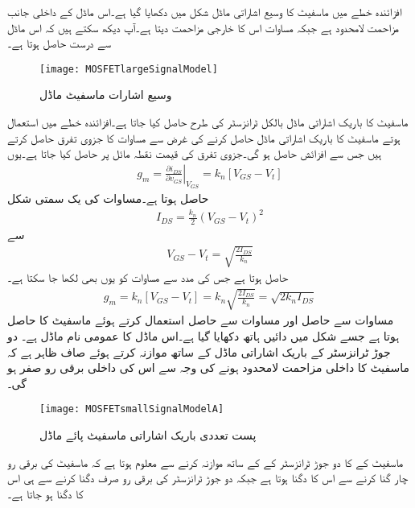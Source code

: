 افزائندہ خطے میں ماسفیٹ کا وسیع اشاراتی ماڈل شکل   میں دکھایا گیا ہے۔اس ماڈل کے داخلی جانب مزاحمت لامحدود ہے جبکہ مساوات   اس کا خارجی مزاحمت   دیتا ہے۔آپ دیکھ سکتے ہیں کہ اس ماڈل سے درست   حاصل ہوتا ہے۔
\begin{figure}
\centering
\texttt{[image: MOSFETlargeSignalModel]}
\caption{وسیع اشارات ماسفیٹ ماڈل}
\label{شکل_وسیع_اشارات_ماسفیٹ_ماڈل}
\end{figure}

ماسفیٹ کا باریک اشاراتی ماڈل بالکل  ٹرانزسٹر کی طرح حاصل کیا جاتا ہے۔افزائندہ خطے میں استعمال ہوتے ماسفیٹ کا باریک اشاراتی ماڈل حاصل کرنے کی غرض سے مساوات   کا جزوی تفرق حاصل کرتے ہیں جس سے افزائش  حاصل ہو گی۔جزوی تفرق کی قیمت نقطہ مائل  پر حاصل کیا جاتا ہے۔یوں
\begin{align} \label{مساوات_میدانی_موصلیت_نما}
g_m = \left. \frac{\partial i_{DS}}{\partial v_{GS}} \right |_{V_{GS}}=k_n \left[V_{GS}-V_t \right ]
\end{align}
حاصل ہوتا ہے۔مساوات   کی یک سمتی شکل
\begin{align*}
I_{DS}=\frac{k_n}{2}\left(V_{GS}-V_t \right)^2
\end{align*}
سے
\begin{align*}
V_{GS}-V_t=\sqrt{\frac{2 I_{DS}}{k_n}}
\end{align*}
حاصل ہوتا ہے جس کی مدد سے مساوات  کو  یوں بھی لکھا جا سکتا ہے۔
\begin{align} \label{مساوات_میدانی_موصلیت_نما_الف}
g_m=k_n \left[V_{GS}-V_t \right ]=k_n \sqrt{\frac{2 I_{DS}}{k_n}}=\sqrt{2 k_n I_{DS}}
\end{align}
مساوات   سے حاصل   اور مساوات   سے حاصل   استعمال کرتے ہوئے ماسفیٹ کا  حاصل ہوتا ہے جسے شکل   میں دائیں ہاتھ دکھایا گیا ہے۔اس ماڈل کا عمومی نام   ماڈل ہے۔ دو جوڑ ٹرانزسٹر کے باریک اشاراتی ماڈل کے ساتھ موازنہ کرتے ہوئے صاف ظاہر ہے کہ ماسفیٹ کا داخلی مزاحمت لامحدود ہونے کی وجہ سے اس کی داخلی برقی رو صفر ہو گی۔
\begin{figure}
\centering
\texttt{[image: MOSFETsmallSignalModelA]}
\caption{پست تعددی باریک اشاراتی ماسفیٹ پائے ماڈل}
\label{شکل_باریک_اشاراتی_ماسفیٹ_ماڈل}
\end{figure}
ماسفیٹ کے  کا دو جوڑ ٹرانزسٹر کے    کے ساتھ موازنہ کرنے سے معلوم ہوتا ہے کہ ماسفیٹ کی برقی رو چار گنا کرنے سے اس کا    دگنا ہوتا ہے جبکہ دو جوڑ ٹرانزسٹر کی برقی رو صرف دگنا کرنے سے ہی اس کا  دگنا ہو جاتا ہے۔

